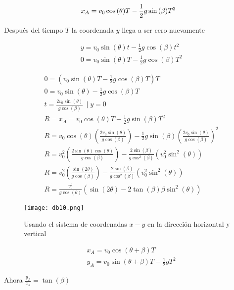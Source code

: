 \begin{equation}
    x_A=v_0\cos{(\theta)}T-\frac{1}{2}g\sin{(\beta)}T^2\\
\end{equation}

Después del tiempo $T$ la coordenada $y$ llega a ser cero nuevamente

\begin{align}
    &y=v_0\sin{(\theta)}t-\frac{1}{2}g\cos{(\beta)}t^2\\
    &0=v_0\sin{(\theta)}T-\frac{1}{2}g\cos{(\beta)}T^2
\end{align}

\begin{align*}
    &0=\left(v_0\sin{(\theta)}T-\frac{1}{2}g\cos{(\beta)}T \right)T\\
    &0=v_0\sin{(\theta)}-\frac{1}{2}g\cos{(\beta)}T\\
    &t=\frac{2v_0\sin{(\theta)}}{g\cos{(\beta)}}\, \mid y=0\\
    &R=x_A=v_0\cos{(\theta)}T-\frac{1}{2}g\sin{(\beta)}T^2\\
    &R=v_0\cos{(\theta)}\left(\frac{2v_0\sin{(\theta)}}{g\cos{(\beta)}}\right)-\frac{1}{2}g\sin{(\beta)}\left(\frac{2v_0\sin{(\theta)}}{g\cos{(\beta)}}\right)^2\\
    &R=v_0^2\left(\frac{2\sin{(\theta)}\cos{(\theta)}}{g\cos{(\beta)}}\right)-\frac{2\sin{(\beta)}}{g\cos^2{(\beta)}}\left(v_0^2\sin^2{(\theta)}\right)\\
    &R=v_0^2\left(\frac{\sin{(2\theta)}}{g\cos{(\beta)}}\right)-\frac{2\sin{(\beta)}}{g\cos^2{(\beta)}}\left(v_0^2\sin^2{(\theta)}\right)\\
    &R=\frac{v_0^2}{g\cos{(\theta)}}\left(\sin{(2\theta)}-2\tan{(\beta)}\beta\sin^2{(\theta)}\right)
\end{align*}

\begin{figure}[h!]
  \centerline{\texttt{[image: db10.png]}}
  \caption{Usando el sistema de coordenadas $x-y$ en la dirección horizontal y vertical}
  \label{db10}
\end{figure}


\begin{align*}
    &x_A=v_0\cos{(\theta+\beta)}T\\
    &y_A=v_0\sin{(\theta+\beta)}T-\frac{1}{2}gT^2
\end{align*}

Ahora $\frac{y_A}{x_a}=\tan{(\beta)}$

